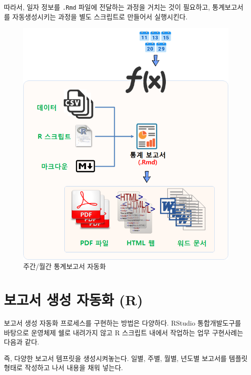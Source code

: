 \documentclass[
  letterpaper,
  chapter,a4paper,showtrims,openright,hidelinks]{oblivoir}
\begin{document}
따라서, 일자 정보를 \texttt{.Rmd} 파일에 전달하는 과정을 거치는 것이
필요하고, 통계보고서를 자동생성시키는 과정을 별도 스크립트로 만들어서
실행시킨다.

\begin{figure}

{\centering \includegraphics{images/report-many-automation.png}

}

\caption{주간/월간 통계보고서 자동화}

\end{figure}

\hypertarget{uxbcf4uxace0uxc11c-uxc0dduxc131-uxc790uxb3d9uxd654-r}{%
\section{보고서 생성 자동화
(R)}\label{uxbcf4uxace0uxc11c-uxc0dduxc131-uxc790uxb3d9uxd654-r}}

보고서 생성 자동화 프로세스를 구현하는 방법은 다양하다. RStudio
통합개발도구를 바탕으로 운영체제 쉘로 내려가지 않고 R 스크립트 내에서
작업하는 업무 구현사례는 다음과 같다.

즉, 다양한 보고서 템프릿을 생성시켜놓는다. 일별, 주별, 월별, 년도별
보고서를 템플릿형태로 작성하고 나서 내용을 채워 넣는다.
\end{document}
